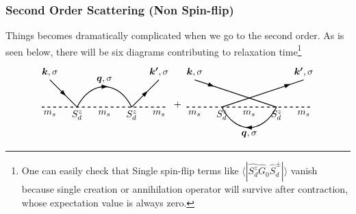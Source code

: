 \documentclass[10pt,aspectratio=43,xcolor=x11names,t]{beamer}%
\begin{document}
		\begin{frame}\frametitle{Second Order Scattering (Non Spin-flip)}
			Things becomes dramatically complicated when we go to the second order. As is seen below, there will be six diagrams contributing to relaxation time\footnote{One can easily check that Single spin-flip terms like $\langle|\hat{S_d^z}\hat{G}_0\hat{S}_d^\pm|\rangle$ vanish because single creation or annihilation operator will survive after contraction, whose expectation value is always zero.}
			\begin{equation*}
				\begin{tikzpicture}[baseline]
					\draw[thick,dashed] (-2.3,0)--(2.3,0);
					\draw[thick] (-2,1)--(-1,0) .. controls (-0.5,1) and (0.5,1) ..(1,0)--(2,1);
					\node[below] at (2,0) {$m_s$};
					\node[below] at (-2,0) {$m_s$};
					\node[below] at (0,0) {$m_s$};
					\node[below] at (1,0) {$S_d^z$};
					\node[below] at (-1,0) {$S_d^z$};
					\node[rotate=-45] at (-1.5,0.5) {\arrow};
					\node at (0,0.75) {\arrow};
					\node at (0,1) {$\bm{q},\sigma$};
					\node[above] at (-2,1) {$\bm{k},\sigma$};
					\node[above] at (2,1) {$\bm{k'},\sigma$};
					\node[rotate=45] at (1.5,0.5) {\arrow};
				\end{tikzpicture}+
				\begin{tikzpicture}[baseline]
					\draw[thick,dashed] (-2.3,0)--(2.3,0);
					\draw[thick] (-2,1)--(1,0) .. controls (0.5,-1) and (-0.5,-1) .. (-1,0)--(2,1);
					\node[below] at (2,0) {$m_s$};
					\node[below] at (-2,0) {$m_s$};
					\node[below] at (0,0) {$m_s$};
					\node[below] at (1,0) {$S_d^z$};
					\node[below] at (-1,0) {$S_d^z$};
					\node[rotate=-20] at (-1.4,0.8) {\arrow};
					\node[rotate=180] at (0,-0.75) {\arrow};
					\node at (0,-1) {$\bm{q},\sigma$};
					\node[above] at (-2,1) {$\bm{k},\sigma$};
					\node[above] at (2,1) {$\bm{k'},\sigma$};
					\node[rotate=20] at (1.4,0.8) {\arrow};
				\end{tikzpicture}
			\end{equation*}
			
		\end{frame}
\end{document}

